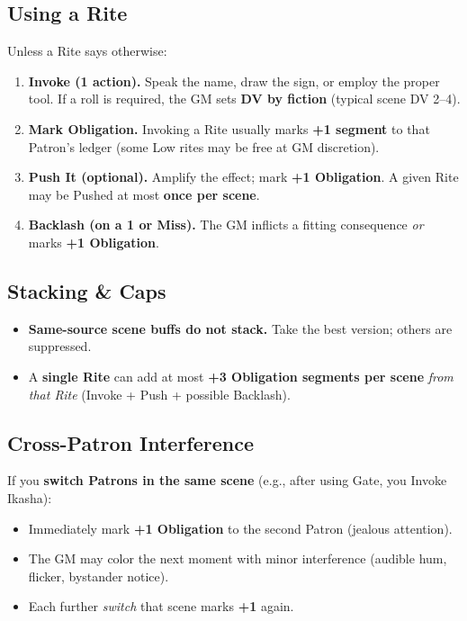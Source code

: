 \subsection{Using a Rite}
Unless a Rite says otherwise:
\begin{enumerate}
  \item \textbf{Invoke (1 action).} Speak the name, draw the sign, or employ the proper tool. If a roll is required, the GM sets \textbf{DV by fiction} (typical scene DV 2–4).
  \item \textbf{Mark Obligation.} Invoking a Rite usually marks \textbf{+1 segment} to that Patron's ledger (some Low rites may be free at GM discretion).
  \item \textbf{Push It (optional).} Amplify the effect; mark \textbf{+1 Obligation}. A given Rite may be Pushed at most \textbf{once per scene}.
  \item \textbf{Backlash (on a 1 or Miss).} The GM inflicts a fitting consequence \emph{or} marks \textbf{+1 Obligation}.
\end{enumerate}

\subsection{Stacking \& Caps}
\begin{itemize}
  \item \textbf{Same-source scene buffs do not stack.} Take the best version; others are suppressed.
  \item A \textbf{single Rite} can add at most \textbf{+3 Obligation segments per scene} \emph{from that Rite} (Invoke + Push + possible Backlash).
\end{itemize}

\subsection{Cross-Patron Interference}
If you \textbf{switch Patrons in the same scene} (e.g., after using Gate, you Invoke Ikasha):
\begin{itemize}
  \item Immediately mark \textbf{+1 Obligation} to the second Patron (jealous attention).
  \item The GM may color the next moment with minor interference (audible hum, flicker, bystander notice).
  \item Each further \emph{switch} that scene marks \textbf{+1} again.
\end{itemize}

